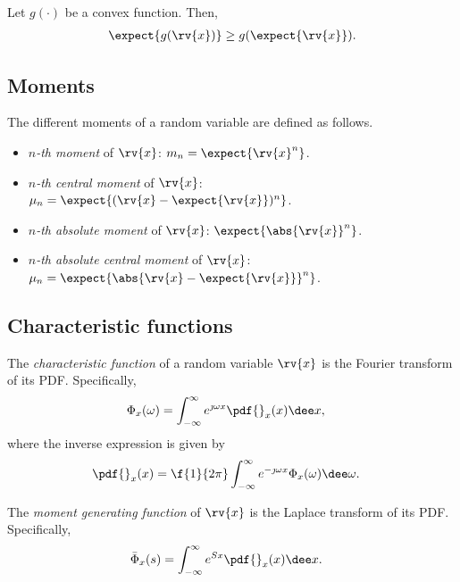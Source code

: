 \begin{mytheorem}
    Let $g(\cdot)$ be a convex function. Then, 
    \begin{align}
        \expect{g(\rv{x})} \geq g(\expect{\rv{x}}).
    \end{align}
\end{mytheorem}

\subsection{Moments}

\begin{mydefinition}[Moments] 
    The different moments of a random variable are defined as follows.   
    \begin{itemize}
        \item \emph{$n$-th moment} of $\rv{x}$: $m_{n}=\expect{\rv{x}^{n}}$.
        \item \emph{$n$-th central moment} of $\rv{x}$: $\mu_{n}=\expect{(\rv{x}-\expect{\rv{x}})^{n}}$.
        \item \emph{$n$-th absolute moment} of $\rv{x}$: $\expect{\abs{\rv{x}}^{n}}$.
        \item \emph{$n$-th absolute central moment} of $\rv{x}$: $\mu_{n}=\expect{\abs{\rv{x}-\expect{\rv{x}}}^{n}}$.
    \end{itemize}
\end{mydefinition}

\subsection{Characteristic functions}
\begin{mydefinition}
  The \emph{characteristic function} of a random variable $\rv{x}$ is the Fourier transform of its PDF. Specifically,
  \begin{align}
      \Phi_{x}(\omega) &= \int_{-\infty}^{\infty} e^{\jmath \omega x}\pdf{}_{x}(x)\dee x,
  \end{align}
  where the inverse expression is given by
  \begin{align}
      \pdf{}_{x}(x) &= \f{1}{2\pi}\int_{-\infty}^{\infty} e^{-\jmath\omega x}\Phi_{x}(\omega) \dee \omega.
  \end{align}
\end{mydefinition}
\begin{mydefinition}
  The \emph{moment generating function} of $\rv{x}$ is the Laplace transform of its PDF. Specifically, 
  \begin{align}
      \bar{\Phi}_{x}(s) &= \int_{-\infty}^{\infty} e^{Sx}\pdf{}_{x}(x)\dee x.
  \end{align}
\end{mydefinition}

